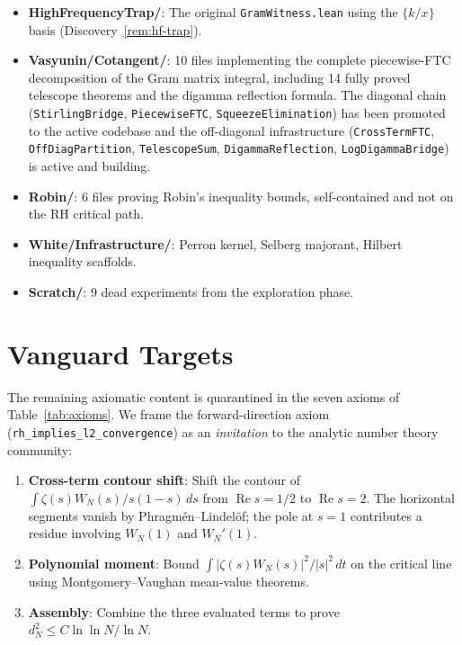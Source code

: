 \documentclass[11pt,a4paper]{article}
\theoremstyle{definition}
\newcommand{\re}{\operatorname{Re}}
\newcommand{\lean}[1]{\texttt{#1}}
\begin{document}
\begin{itemize}
  \item \textbf{HighFrequencyTrap/}: The original \lean{GramWitness.lean}
    using the $\{k/x\}$ basis (Discovery~\ref{rem:hf-trap}).
  \item \textbf{Vasyunin/Cotangent/}: 10 files implementing the complete
    piecewise-FTC decomposition of the Gram matrix integral, including
    14 fully proved telescope theorems and the digamma reflection formula.
    The diagonal chain (\lean{StirlingBridge}, \lean{PiecewiseFTC},
    \lean{SqueezeElimination}) has been promoted to the active codebase
    and the off-diagonal infrastructure (\lean{CrossTermFTC},
    \lean{OffDiagPartition}, \lean{TelescopeSum}, \lean{DigammaReflection},
    \lean{LogDigammaBridge}) is active and building.
  \item \textbf{Robin/}: 6 files proving Robin's inequality bounds,
    self-contained and not on the RH critical path.
  \item \textbf{White/Infrastructure/}: Perron kernel, Selberg majorant,
    Hilbert inequality scaffolds.
  \item \textbf{Scratch/}: 9 dead experiments from the exploration phase.
\end{itemize}

\section{Vanguard Targets}
\label{sec:vanguard}

The remaining axiomatic content is quarantined in the seven axioms of
Table~\ref{tab:axioms}. We frame the forward-direction axiom
(\lean{rh\_implies\_l2\_convergence}) as an \emph{invitation}
to the analytic number theory community:

\begin{enumerate}
  \item \textbf{Cross-term contour shift}: Shift the contour of
    $\int \zeta(s)W_N(s)/s(1-s)\,ds$ from $\re s = 1/2$ to $\re s = 2$.
    The horizontal segments vanish by Phragm\'en--Lindel\"of; the
    pole at $s=1$ contributes a residue involving $W_N(1)$ and $W_N'(1)$.
  \item \textbf{Polynomial moment}: Bound
    $\int |\zeta(s)W_N(s)|^2/|s|^2\,dt$ on the critical line
    using Montgomery--Vaughan mean-value theorems.
  \item \textbf{Assembly}: Combine the three evaluated terms
    to prove $d_N^2 \leq C \ln\ln N / \ln N$.
\end{enumerate}
\end{document}
